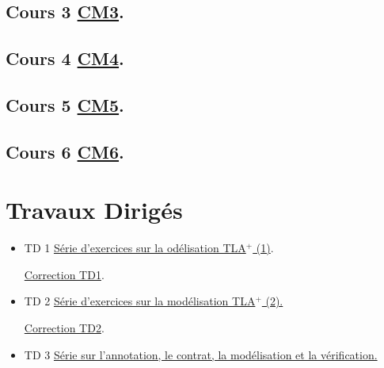 \documentclass[ 12pt]{article}
\begin{document}
\begin{tcolorbox}
\subsection{Cours 3
  \href{http://mery54.github.io/teaching/mvsi/lecturesnotes/lectures-app-2024-cm3.pdf}{CM3}. }



\subsection{Cours 4
  \href{http://mery54.github.io/teaching/mvsi/lecturesnotes/lectures-app-2024-cm4.pdf}{CM4}. }




\subsection{Cours 5
  \href{http://mery54.github.io/teaching/mvsi/lecturesnotes/lectures-app-2024-2.pdf}{CM5}. }




\subsection{Cours 6
  \href{http://mery54.github.io/teaching/mvsi/lecturesnotes/lectures-app-2024-3.pdf}{CM6}. }

  

\section{Travaux Dirigés}

  \begin{itemize}
  \item[]   TD 1 
    \href{http://mery54.github.io/teaching/mvsi/lecturesnotes/newtd1.pdf}{Série d'exercices sur la od\'elisation TLA$^+$  (1)}.

       \href{http://mery54.github.io/teaching/mvsi/lecturesnotes/cnewtd1.pdf}{Correction 
       TD1}.

       
  \item[]   TD 2 
    \href{http://mery54.github.io/teaching/mvsi/lecturesnotes/td2.pdf}{Série
      d'exercices sur la mod\'elisation TLA$^+$ (2).}   

          \href{http://mery54.github.io/teaching/mvsi/lecturesnotes/ctd2.pdf}{Correction 
            TD2}.
          
  \item[]   TD 3 
    \href{http://mery54.github.io/teaching/mvsi/lecturesnotes/td3.pdf}{
      Série sur l'annotation, le contrat, la  mod\'elisation et  la v\'erification.}


\end{itemize}
\end{tcolorbox}
\end{document}
